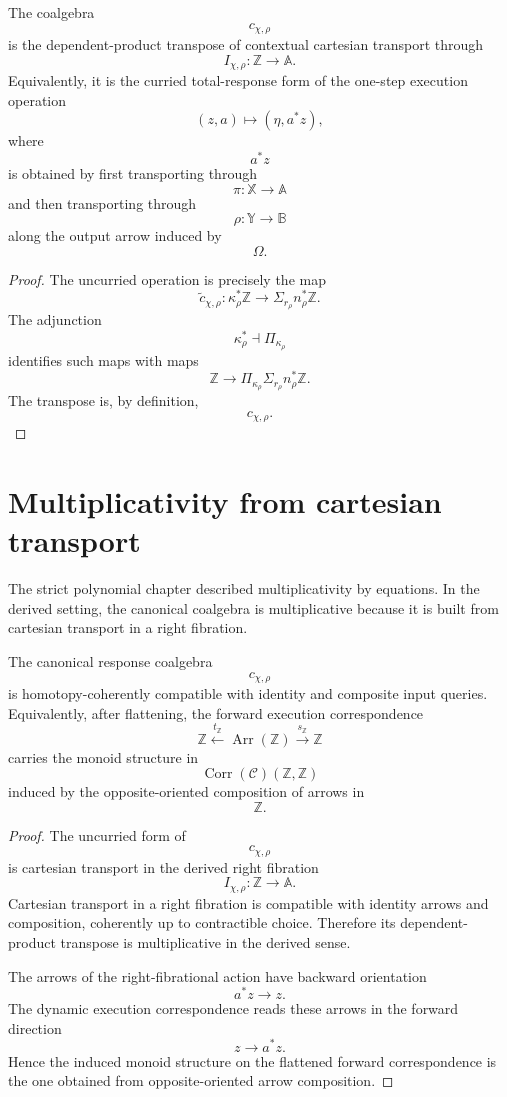 \begin{theorem}
\label{thm:derived-poly-coalgebra-transpose}
The coalgebra
\[
c_{\chi,\rho}
\]
is the dependent-product transpose of contextual cartesian transport through
\[
I_{\chi,\rho}:\mathbb Z\to\mathbb A.
\]
Equivalently, it is the curried total-response form of the one-step execution
operation
\[
(z,a)
\longmapsto
(\eta,a^\ast z),
\]
where
\[
a^\ast z
\]
is obtained by first transporting through
\[
\pi:\mathbb X\to\mathbb A
\]
and then transporting through
\[
\rho:\mathbb Y\to\mathbb B
\]
along the output arrow induced by
\[
\Omega.
\]
\end{theorem}

\begin{proof}
The uncurried operation is precisely the map
\[
\widetilde c_{\chi,\rho}:
\kappa_\rho^\ast\mathbb Z
\to
\Sigma_{r_\rho}n_\rho^\ast\mathbb Z.
\]
The adjunction
\[
\kappa_\rho^\ast\dashv\Pi_{\kappa_\rho}
\]
identifies such maps with maps
\[
\mathbb Z
\to
\Pi_{\kappa_\rho}\Sigma_{r_\rho}n_\rho^\ast\mathbb Z.
\]
The transpose is, by definition,
\[
c_{\chi,\rho}.
\]
\end{proof}

\section{Multiplicativity from cartesian transport}
\label{sec:derived-poly-multiplicativity}

The strict polynomial chapter described multiplicativity by equations.  In
the derived setting, the canonical coalgebra is multiplicative because it is
built from cartesian transport in a right fibration.

\begin{proposition}
\label{prop:derived-poly-canonical-coalgebra-multiplicative}
The canonical response coalgebra
\[
c_{\chi,\rho}
\]
is homotopy-coherently compatible with identity and composite input queries.
Equivalently, after flattening, the forward execution correspondence
\[
\mathbb Z
\xleftarrow{t_{\mathbb Z}}
\operatorname{Arr}(\mathbb Z)
\xrightarrow{s_{\mathbb Z}}
\mathbb Z
\]
carries the monoid structure in
\[
\operatorname{Corr}(\mathcal C)(\mathbb Z,\mathbb Z)
\]
induced by the opposite-oriented composition of arrows in
\[
\mathbb Z.
\]
\end{proposition}

\begin{proof}
The uncurried form of
\[
c_{\chi,\rho}
\]
is cartesian transport in the derived right fibration
\[
I_{\chi,\rho}:\mathbb Z\to\mathbb A.
\]
Cartesian transport in a right fibration is compatible with identity arrows
and composition, coherently up to contractible choice.  Therefore its
dependent-product transpose is multiplicative in the derived sense.

The arrows of the right-fibrational action have backward orientation
\[
a^\ast z\to z.
\]
The dynamic execution correspondence reads these arrows in the forward
direction
\[
z\to a^\ast z.
\]
Hence the induced monoid structure on the flattened forward correspondence is
the one obtained from opposite-oriented arrow composition.
\end{proof}

